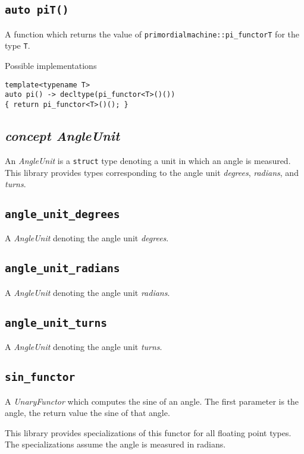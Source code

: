 \documentclass[oneside]{article}
\begin{document}
\subsection{\texttt{auto pi\textlangle T\textrangle()}}
A function which returns the value of \texttt{primordialmachine::pi\_functor\textlangle T\textrangle}
for the type \texttt{T}.

\noindent{}Possible implementations
\begin{verbatim}
template<typename T>
auto pi() -> decltype(pi_functor<T>()())
{ return pi_functor<T>()(); }
\end{verbatim}

\subsection{\textit{concept AngleUnit}}
An \textit{AngleUnit} is a \texttt{struct} type denoting a unit in which an angle is measured.
This library provides types corresponding to the angle unit \textit{degrees}, \textit{radians},
and \textit{turns}.

\subsection{\texttt{angle\_unit\_degrees}}
A \textit{AngleUnit} denoting the angle unit \textit{degrees}.
\subsection{\texttt{angle\_unit\_radians}}
A \textit{AngleUnit} denoting the angle unit \textit{radians}.
\subsection{\texttt{angle\_unit\_turns}}
A \textit{AngleUnit} denoting the angle unit \textit{turns}.

\subsection{\texttt{sin\_functor}}
A \textit{UnaryFunctor} which computes the
sine
of an angle.
The first parameter is the angle, the return value the sine of that angle.

\noindent{}This library provides specializations of this functor for all floating point types.
The specializations assume the angle is measured in radians.
\end{document}
